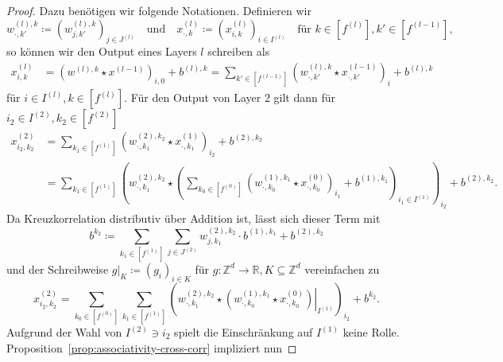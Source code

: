 \documentclass[paper=a4, 	%
		fontsize=11pt, 		%
		abstracton, 	%
		headsepline, 	%
		notitlepage	%
		]{scrartcl}
\theoremstyle{definition}
\newcommand{\R}{\mathbb{R}}
\newcommand{\Z}{\mathbb{Z}}
\newcommand{\fNat}[1]{[ #1 ]}
\begin{document}
\begin{proof}
    \newcommand{\bcdot}{\boldsymbol{\cdot}}
    Dazu benötigen wir folgende Notationen.
    Definieren wir \[
        w^{(l), k}_{\bcdot, k'}\coloneqq \left( w_{j,k'}^{(l),k}\right)_{j\in J^{(l)}}
        \quad \text{und} \quad
        x^{(l)}_{\bcdot, k} \coloneqq \left( x^{(l)}_{i,k} \right)_{i\in I^{(l)}}
        \quad \text{für $k\in \fNat{f^{(l)}}, k'\in\fNat{f^{(l-1)}}$},
    \]
    so können wir den Output eines Layers $l$ schreiben als 
    \begin{align*}
        x^{(l)}_{i, k}
        &=  \left( w^{(l),k} \star x^{(l-1)}\right)_{i,0} + b^{(l),k}
        = \sum_{k'\in \fNat{f^{(l-1)}}}  \left(w^{(l),k}_{\bcdot,k'} \star x^{(l-1)}_{\bcdot,k'} \right)_i + b^{(l),k}
    \end{align*}
    für $i\in I^{(l)}, k\in\fNat{f^{(l)}}$.
    Für den Output von Layer $2$ gilt dann für $i_2\in I^{(2)}, k_2\in \fNat{f^{(2)}}$
    \begin{align*}
        x^{(2)}_{i_2,k_2}
        &= \sum_{k_1\in \fNat{f^{(1)}}}  \left(w^{(2),k_2}_{\bcdot,k_1} \star x^{(1)}_{\bcdot,k_1} \right)_{i_2} + b^{(2),k_2} \\
        &= \sum_{k_1\in \fNat{f^{(1)}}}  \left(w^{(2),k_2}_{\bcdot,k_1} \star \left( 
%
            \sum_{k_0\in \fNat{f^{(0)}}}  \left(w^{(1),k_1}_{\bcdot,k_0} \star x^{(0)}_{\bcdot,k_0} \right)_{i_1} + b^{(1),k_1}
%
         \right)_{i_1\in I^{(1)}} \right)_{i_2} + b^{(2),k_2}.
    \end{align*}
    Da Kreuzkorrelation distributiv über Addition ist, lässt sich dieser Term mit \[
        b^{k_2}\coloneqq \sum_{k_1\in\fNat{f^{(1)}}}\sum_{j\in J^{(2)}} w^{(2), k_2}_{j,k_1} \cdot b^{(1),k_1} + b^{(2), k_2}
    \]
    \newcommand{\rest}[2]{\left.{#1}\right|_{#2}}
    und der Schreibweise $\rest{g}{K} \coloneqq (g_i)_{i\in K}$ für $g: \Z^d \rightarrow \R, K\subseteq \Z^d$ vereinfachen zu 
    \[
        x^{(2)}_{i_2,k_2} 
        = \sum_{k_0\in \fNat{f^{(0)}}}\sum_{k_1\in \fNat{f^{(1)}}}  \left(w^{(2),k_2}_{\bcdot,k_1} \star 
        \rest{\left(w^{(1),k_1}_{\bcdot,k_0} \star x^{(0)}_{\bcdot,k_0} \right)}{I^{(1)}}
        \right)_{i_2} + b^{k_2}.
    \]
    Aufgrund der Wahl von $I^{(2)}\ni i_2$ spielt die Einschränkung auf $I^{(1)}$ keine Rolle.
    Proposition~\ref{prop:associativity-cross-corr} impliziert nun

\end{proof}
\end{document}
